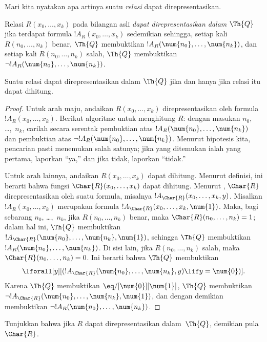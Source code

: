 \documentclass[../../../include/open-logic-section]{subfiles}
\begin{document}


Mari kita nyatakan apa artinya suatu \emph{relasi} dapat direpresentasikan.

\begin{defn}
 Relasi $R(x_0,\dots,x_k)$ pada
bilangan asli {\em dapat direpresentasikan dalam $\Th{Q}$} jika terdapat
formula $!A_R(x_0,\dots,x_k)$ sedemikian sehingga, setiap kali
$R(n_0,\dots,n_k)$ benar, $\Th{Q}$ membuktikan
$!A_R(\num{n_0},\dots,\num{n_k})$, dan setiap kali
$R(n_0,\dots,n_k)$ salah, $\Th{Q}$ membuktikan
$\lnot !A_R(\num{n_0}, \dots, \num{n_k})$.
\end{defn}

\begin{thm}
 Suatu relasi dapat direpresentasikan dalam
$\Th{Q}$ jika dan hanya jika relasi itu dapat dihitung.
\end{thm}

\begin{proof}
Untuk arah maju, andaikan $R(x_0,\dots,x_k)$ direpresentasikan oleh formula
$!A_R(x_0,\dots,x_k)$. Berikut algoritme untuk menghitung $R$: dengan masukan
$n_0$, \dots,~$n_k$, carilah secara serentak pembuktian atas
$!A_R(\num{n_0}, \dots, \num{n_k})$ dan pembuktian atas
$\lnot !A_R(\num{n_0}, \dots, \num{n_k})$. Menurut hipotesis kita,
pencarian pasti menemukan salah satunya; jika yang ditemukan ialah yang
pertama, laporkan ``ya,'' dan jika tidak, laporkan ``tidak.''

Untuk arah lainnya, andaikan $R(x_0, \dots, x_k)$ dapat dihitung. Menurut
definisi, ini berarti bahwa fungsi $\Char{R}(x_0, \dots, x_k)$ dapat
dihitung. Menurut , $\Char{R}$
direpresentasikan oleh suatu formula, misalnya
$!A_{\Char{R}}(x_0, \dots, x_k, y)$. Misalkan
$!A_R(x_0, \dots, x_k)$ merupakan formula
$!A_{\Char{R}}(x_0, \dots, x_k, \num{1})$. Maka, bagi sebarang
$n_0$, \dots,~$n_k$, jika $R(n_0, \dots, n_k)$ benar, maka
$\Char{R}(n_0, \dots, n_k) = 1$; dalam hal ini, $\Th{Q}$ membuktikan
$!A_{\Char{R}}(\num{n_0}, \dots, \num{n_k}, \num{1})$, sehingga
$\Th{Q}$ membuktikan $!A_R(\num{n_0}, \dots, \num{n_k})$. Di sisi lain,
jika $R(n_0, \dots, n_k)$ salah, maka
$\Char{R}(n_0, \dots, n_k) = 0$. Ini berarti bahwa $\Th{Q}$ membuktikan
\[
\lforall[y][(!A_{\Char{R}}(\num{n_0}, \dots, \num{n_k}, y) \lif y =
  \num{0})].
\]
Karena $\Th{Q}$ membuktikan $\eq/[\num{0}][\num{1}]$, $\Th{Q}$ membuktikan
$\lnot !A_{\Char{R}}(\num{n_0}, \dots, \num{n_k}, \num{1})$, dan dengan
demikian membuktikan $\lnot !A_R(\num{n_0}, \dots, \num{n_k})$.
\end{proof}

\begin{prob}
Tunjukkan bahwa jika $R$ dapat direpresentasikan dalam~$\Th{Q}$, demikian
pula~$\Char{R}$.
\end{prob}
\end{document}

